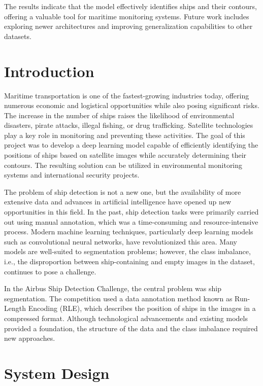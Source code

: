 \documentclass{article}
\begin{document}
The results indicate that the model effectively identifies ships and their contours, offering a valuable tool for maritime monitoring systems. Future work includes exploring newer architectures and improving generalization capabilities to other datasets.


\section{Introduction}

Maritime transportation is one of the fastest-growing industries today, offering numerous economic and logistical opportunities while also posing significant risks. The increase in the number of ships raises the likelihood of environmental disasters, pirate attacks, illegal fishing, or drug trafficking. Satellite technologies play a key role in monitoring and preventing these activities. The goal of this project was to develop a deep learning model capable of efficiently identifying the positions of ships based on satellite images while accurately determining their contours. The resulting solution can be utilized in environmental monitoring systems and international security projects.

The problem of ship detection is not a new one, but the availability of more extensive data and advances in artificial intelligence have opened up new opportunities in this field. In the past, ship detection tasks were primarily carried out using manual annotation, which was a time-consuming and resource-intensive process. Modern machine learning techniques, particularly deep learning models such as convolutional neural networks, have revolutionized this area. Many models are well-suited to segmentation problems; however, the class imbalance, i.e., the disproportion between ship-containing and empty images in the dataset, continues to pose a challenge.

In the Airbus Ship Detection Challenge, the central problem was ship segmentation. The competition used a data annotation method known as Run-Length Encoding (RLE), which describes the position of ships in the images in a compressed format. Although technological advancements and existing models provided a foundation, the structure of the data and the class imbalance required new approaches.

\section{System Design}
\end{document}

